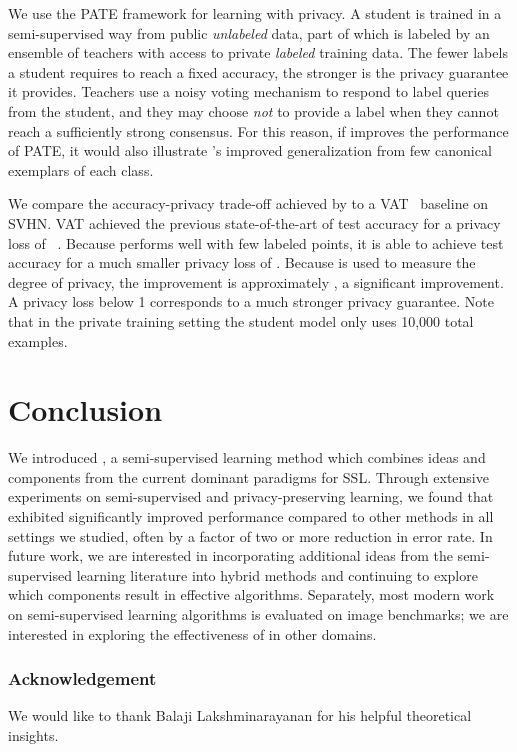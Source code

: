 \documentclass{article}
\newif\ifsubmission\submissionfalse
\begin{document}
We use the PATE framework for learning with privacy. A student is trained in a semi-supervised way from public \textit{unlabeled} data, part of which is labeled by an ensemble of teachers with access to private \textit{labeled} training data. The fewer labels a student requires to reach a fixed accuracy, the stronger is the privacy guarantee it provides. Teachers use a noisy voting mechanism to respond to label queries from the student, and they may choose \textit{not} to provide a label when they cannot reach a sufficiently strong consensus.
For this reason, if  improves the performance of PATE, it would also illustrate 's improved generalization from few canonical exemplars of each class. 

We compare the accuracy-privacy trade-off achieved by  to a VAT~\cite{miyato2018virtual} baseline on SVHN. VAT achieved the previous state-of-the-art of  test accuracy for a privacy loss of ~\cite{papernot2018scalable}.
Because  performs well with few labeled points, it is able to achieve  test accuracy for a much smaller privacy loss of .
Because  is used to measure the degree of privacy, the  improvement is approximately , a significant improvement. A privacy loss  below 1 corresponds to a much stronger privacy guarantee.
Note that in the private training setting the student model only uses 10,000 total examples.

\section{Conclusion}

We introduced , a semi-supervised learning method which combines ideas and components from the current dominant paradigms for SSL.
Through extensive experiments on semi-supervised and privacy-preserving learning, we found that  exhibited significantly improved performance compared to other methods in all settings we studied, often by a factor of two or more reduction in error rate.
In future work, we are interested in incorporating additional ideas from the semi-supervised learning literature into hybrid methods and continuing to explore which components result in effective algorithms.
Separately, most modern work on semi-supervised learning algorithms is evaluated on image benchmarks; we are interested in exploring the effectiveness of  in other domains.

\ifsubmission
\else
\subsubsection*{Acknowledgement}
We would like to thank Balaji Lakshminarayanan for his helpful theoretical insights.
\fi
\end{document}
